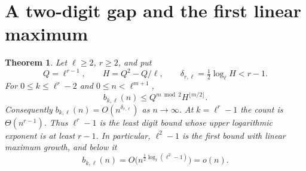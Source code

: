 \documentclass[11pt]{article}
\newtheorem{theorem}{Theorem}
\begin{document}
\section{A two-digit gap and the first linear maximum}
\begin{theorem}\label{thm:threshold}
Let $\ell\ge2$, $r\ge2$, and put
\[
 Q=\ell^{r-1},\qquad H=Q^2-Q/\ell,
 \qquad \delta_{r,\ell}=\tfrac12\log_\ell H<r-1.
\]
For $0\le k\le\ell^r-2$ and $0\le n<\ell^{m+1}$,
\begin{equation}\label{eq:block}
 b_{k,\ell}(n)\le Q^{m\bmod2}H^{\lfloor m/2\rfloor}.
\end{equation}
Consequently $b_{k,\ell}(n)=O(n^{\delta_{r,\ell}})$ as $n\to\infty$.
At $k=\ell^r-1$ the count is $\Theta(n^{r-1})$.
Thus $\ell^r-1$ is the least digit bound whose upper logarithmic exponent
is at least $r-1$.
In particular, $\ell^2-1$ is the first bound with linear maximum growth,
and below it
\[
 b_{k,\ell}(n)=O\bigl(n^{\frac12\log_\ell(\ell^2-1)}\bigr)=o(n).
\]
\end{theorem}
\end{document}
